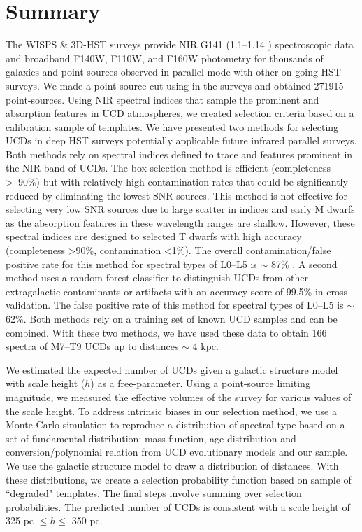 \documentclass[manuscript]{aastex63}
\begin{document}
\section{Summary}
The WISPS \& 3D-HST surveys provide NIR G141 (1.1--1.14 \micron) spectroscopic data and broadband F140W, F110W, and F160W photometry for thousands of galaxies and point-sources observed in parallel mode with other on-going HST surveys. We made a point-source cut using in the surveys and obtained 271915 point-sources. Using NIR spectral indices that sample the prominent \wat and \meth absorption features in UCD atmospheres, we created selection criteria based on a calibration sample of templates. We have presented two methods for selecting UCDs in deep HST surveys potentially applicable future infrared parallel surveys. Both methods rely on spectral indices defined to trace \wat and \meth features prominent in the NIR band of UCDs. The box selection method is efficient (completeness \textgreater\ 90\%) but with relatively high contamination rates that could be significantly reduced by eliminating the lowest SNR sources. This method is not effective for selecting very low SNR sources due to large scatter in indices and early M dwarfs as the absorption features in these wavelength ranges are shallow. However, these spectral indices are designed to selected T dwarfs with high accuracy (completeness \textgreater 90\%, contamination \textless 1\%). The overall contamination/false positive rate for this method for spectral types of L0--L5 is $\sim$ 87\% . A second method uses a random forest classifier to distinguish UCDs from other extragalactic contaminants or artifacts with an accuracy score of 99.5\% in cross-validation. The false positive rate of this method  for spectral types of L0--L5 is $\sim$62\%. Both methods rely on a training set of known UCD samples and can be combined. With these two methods, we have used these data to obtain 166 spectra of M7--T9 UCDs up to distances $\sim$ 4 kpc. 

We estimated the expected number of UCDs given a galactic structure model with scale height ($h$) as a free-parameter. Using a point-source limiting magnitude, we measured the effective volumes of the survey for various values of the scale height. To address intrinsic biases in our selection method, we use a Monte-Carlo simulation to reproduce a distribution of spectral type based on a set of fundamental distribution: mass function, age distribution and conversion/polynomial relation from UCD evolutionary models and our sample. We use the galactic structure model to draw a distribution of distances. With these distributions, we create a selection probability function based on sample of ``degraded" templates. The final steps involve summing over selection probabilities. The predicted number of UCDs is consistent with a scale height of 325 pc $\leq h \leq$ 350 pc.  
\end{document}
